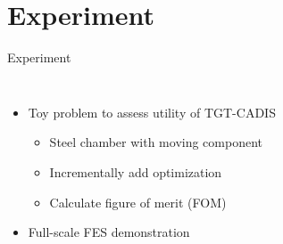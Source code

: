 \documentclass{beamer}
\begin{document}
\section{Experiment}
\begin{frame}{Experiment}
\begin{columns}
	\begin{itemize}
		\item{Toy problem to assess utility of TGT-CADIS}
	\begin{itemize}
		\item{Steel chamber with moving component}
		\item{Incrementally add optimization}
		\item{Calculate figure of merit (FOM) }
	\end{itemize}
\item{Full-scale FES demonstration}
	\end{itemize}
\end{columns}
\end{frame}
\end{document}

